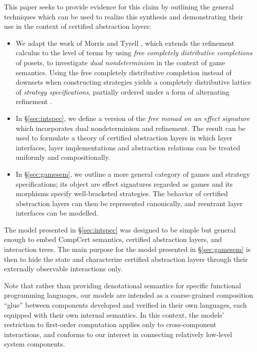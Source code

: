 \documentclass[sigplan,screen]{acmart}
\begin{document}
This paper seeks to provide evidence for this claim
by outlining the general techniques
which can be used to realize this synthesis
and demonstrating their use
in the context of certified abstraction layers:
\begin{itemize}
\item
  We adapt the work of Morris and Tyrell \cite{augtyp,dndf},
  which extends the refinement calculus to the level of terms
  by using \emph{free completely distributive completions} of posets,
  to investigate \emph{dual nondeterminism}
  in the context of game semantics.
  Using the free completely distributive completion
  instead of downsets when constructing strategies
  yields a completely distributive lattice of
  \emph{strategy specifications},
  partially ordered
  under a form of alternating refinement
  \cite{altref}.
\item
  In \S\ref{sec:intspec},
  we define a version of the
  \emph{free monad on an effect signature}
  which incorporates dual nondeterminism and refinement.
  The result can be used to formulate a theory of certified abstraction
  layers in which
  layer interfaces, layer implementations and abstraction relations
  can be treated uniformly and compositionally.
\item
  In \S\ref{sec:gamesem},
  we outline a more general category of games and
  strategy specifications;
  its object are effect signatures regarded as games
  and its morphisms specify well-bracketed strategies.
  The behavior of certified abstraction layers
  can then be represented canonically,
  and reentrant layer interfaces can be modelled.
\end{itemize}

The model presented in \S\ref{sec:intspec} was designed to be simple but
general enough to embed CompCert semantics, certified
abstraction layers, and interaction trees. The main purpose for
the model presented in \S\ref{sec:gamesem} is then to hide the state and
characterize certified abstraction layers through
their externally observable interactions only.

Note that rather than providing
denotational semantics for specific functional programming
languages, our models are intended as a coarse-grained composition
``glue'' between components developed and verified in their own
languages, each equipped with their own internal semantics.
In this context,
the models' restriction to first-order computation
applies only to cross-component interactions,
and conforms to our interest in connecting
relatively low-level system components.
\end{document}
